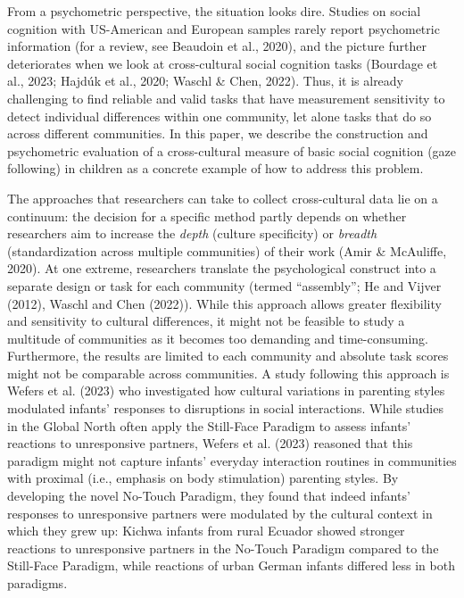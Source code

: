\documentclass[
  man,floatsintext]{apa7}
\begin{document}
From a psychometric perspective, the situation looks dire. Studies on social cognition with US-American and European samples rarely report psychometric information (for a review, see Beaudoin et al., 2020), and the picture further deteriorates when we look at cross-cultural social cognition tasks (Bourdage et al., 2023; Hajdúk et al., 2020; Waschl \& Chen, 2022).
Thus, it is already challenging to find reliable and valid tasks that have measurement sensitivity to detect individual differences within one community, let alone tasks that do so across different communities.
In this paper, we describe the construction and psychometric evaluation of a cross-cultural measure of basic social cognition (gaze following) in children as a concrete example of how to address this problem.

The approaches that researchers can take to collect cross-cultural data lie on a continuum: the decision for a specific method partly depends on whether researchers aim to increase the \emph{depth} (culture specificity) or \emph{breadth} (standardization across multiple communities) of their work (Amir \& McAuliffe, 2020).
At one extreme, researchers translate the psychological construct into a separate design or task for each community (termed ``assembly''; He and Vijver (2012), Waschl and Chen (2022)).
While this approach allows greater flexibility and sensitivity to cultural differences, it might not be feasible to study a multitude of communities as it becomes too demanding and time-consuming.
Furthermore, the results are limited to each community and absolute task scores might not be comparable across communities.
A study following this approach is Wefers et al. (2023) who investigated how cultural variations in parenting styles modulated infants' responses to disruptions in social interactions.
While studies in the Global North often apply the Still-Face Paradigm to assess infants' reactions to unresponsive partners, Wefers et al. (2023) reasoned that this paradigm might not capture infants' everyday interaction routines in communities with proximal (i.e., emphasis on body stimulation) parenting styles.
By developing the novel No-Touch Paradigm, they found that indeed infants' responses to unresponsive partners were modulated by the cultural context in which they grew up: Kichwa infants from rural Ecuador showed stronger reactions to unresponsive partners in the No-Touch Paradigm compared to the Still-Face Paradigm, while reactions of urban German infants differed less in both paradigms.
\end{document}
